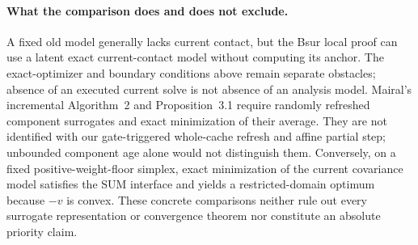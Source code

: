 \paragraph{What the comparison does and does not exclude.}
A fixed old model generally lacks current contact, but the Bsur local proof
can use a latent exact current-contact model without computing its anchor.
The exact-optimizer and boundary conditions above remain separate obstacles;
absence of an executed current solve is not absence of an analysis model.
Mairal's incremental Algorithm~2 and Proposition~3.1 require randomly refreshed
component surrogates and exact minimization of their average. They are not
identified with our gate-triggered whole-cache refresh and affine partial
step; unbounded component age alone would not distinguish them.
Conversely, on a fixed positive-weight-floor simplex, exact minimization of
the current covariance model satisfies the SUM interface and yields a
restricted-domain optimum because $-v$ is convex. These concrete comparisons
neither rule out every surrogate representation or convergence theorem nor
constitute an absolute priority claim.
